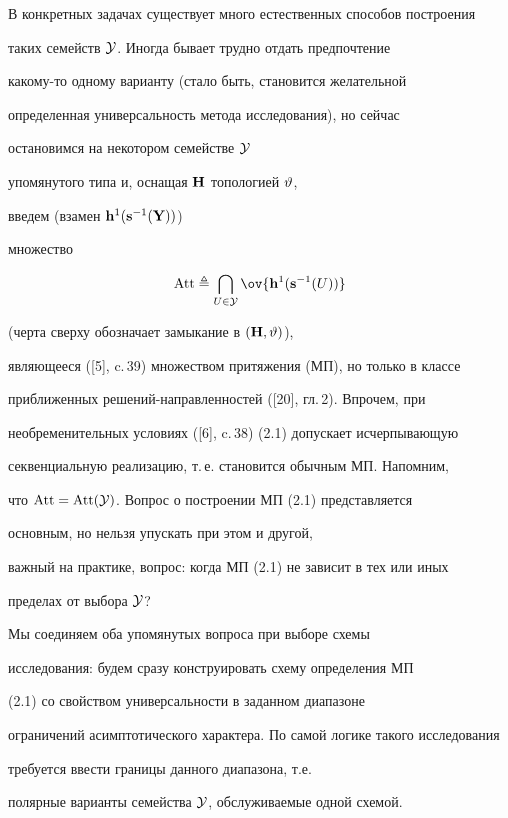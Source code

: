 В конкретных задачах существует много естественных способов построения


таких семейств ${\cal Y}$. Иногда бывает трудно отдать предпочтение


какому-то одному варианту (стало быть, становится желательной


определенная универсальность метода исследования), но сейчас


остановимся на некотором семействе ${\cal Y}$


упомянутого типа и, оснащая ${\bold H}$ топологией $\vartheta$,


введем (взамен ${{\bold h}^1}({{\bold s}^{-1}}({\bold Y}))$)


множество


\begin{equation}


\Att \triangleq \bigcap\limits_{U \in


\cal Y} \ov{\bold h^1(\bold s^{-1}(U))}


\end{equation}


(черта сверху обозначает замыкание в $({\bold H},\vartheta)$),


являющееся ([5], c.\,39) множеством притяжения (МП), но только в классе


приближенных решений-направленностей ([20], гл.\,2). Впрочем, при


необременительных условиях ([6], c.\,38) (2.1) допускает исчерпывающую


секвенциальную реализацию, т.\,е. становится обычным МП. Напомним,


что ${\operatorname{Att}} = {\operatorname{Att}}({\cal Y})$. Вопрос о построении МП (2.1) представляется


основным, но нельзя упускать при этом и другой,


важный на практике, вопрос: когда МП (2.1) не зависит в тех или иных


пределах от выбора ${\cal Y}$?


Мы соединяем оба упомянутых вопроса при выборе схемы


исследования: будем сразу конструировать схему определения МП


(2.1) со свойством универсальности в заданном диапазоне


ограничений асимптотического характера. По самой логике такого исследования


требуется ввести границы данного диапазона, т.е.


полярные варианты семейства ${\cal Y}$, обслуживаемые одной схемой.


